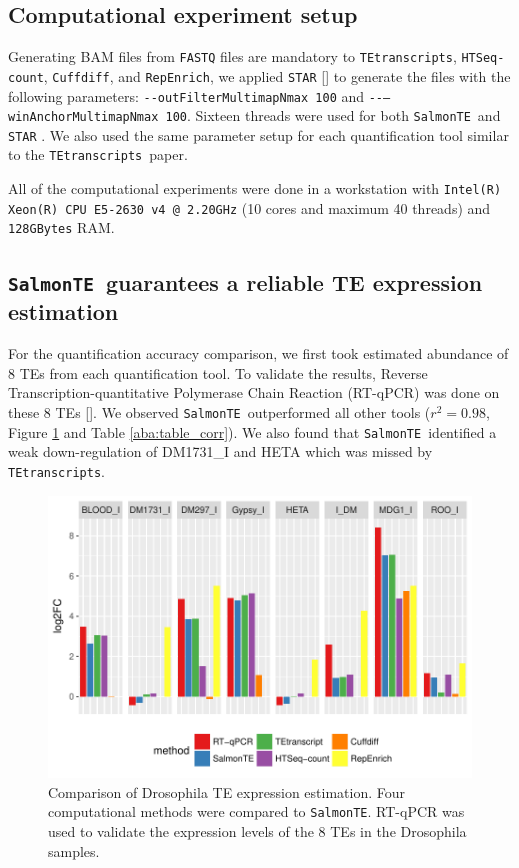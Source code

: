 \documentclass[wsdraft]{ws-procs11x85}
\newcommand{\TEtranscripts}{\texttt{TEtranscripts}}
\newcommand{\SalmonTE}{\texttt{SalmonTE}}
\newcommand{\HTSeq}{\texttt{HTSeq-count}}
\newcommand{\Cuffdiff}{\texttt{Cuffdiff}}
\newcommand{\RepEnrich}{\texttt{RepEnrich}}
\begin{document}
\subsection{Computational experiment setup}

Generating BAM files from \verb|FASTQ| files are mandatory to  \TEtranscripts, \HTSeq, \Cuffdiff, and \RepEnrich, we applied \verb|STAR| [] to generate the files with the following parameters: \verb|--outFilterMultimapNmax 100| and \verb|--–winAnchorMultimapNmax 100|. Sixteen threads were used for  both \SalmonTE~and \verb|STAR| . We also used the same parameter setup for each quantification tool similar to the \TEtranscripts~paper.

All of the computational experiments were done in a workstation with \texttt{Intel(R) Xeon(R) CPU E5-2630 v4 @ 2.20GHz} (10 cores and maximum 40 threads) and \texttt{128GBytes} RAM. 

\subsection{\SalmonTE~guarantees a reliable TE expression estimation}

For the quantification accuracy comparison, we first took estimated abundance of 8 TEs from each quantification tool. To validate the results, Reverse Transcription-quantitative Polymerase Chain Reaction (RT-qPCR) was done on these 8 TEs [].
We observed \SalmonTE~outperformed all other tools ($r^2=0.98$, Figure \ref{aba:fig4} and Table \ref{aba:table_corr}). We also found that \SalmonTE~identified a weak down-regulation of DM1731\_I and HETA which was missed by \TEtranscripts.

\begin{figure}[h]
\centerline{
\includegraphics[width=14cm]{fig_bar}
}
\caption{Comparison of Drosophila TE expression estimation. Four computational methods were compared to \SalmonTE.  
RT-qPCR was used to validate the expression levels of the 8 TEs in the
Drosophila samples.}
\label{aba:fig4}
\end{figure}
\end{document}
